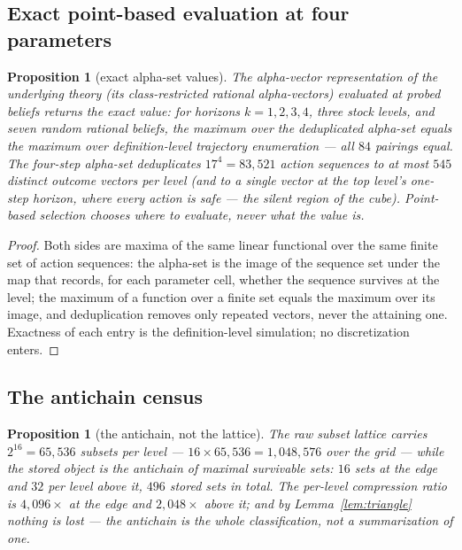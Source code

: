 \documentclass[10pt,twocolumn]{article}
\theoremstyle{plain}
\newtheorem{proposition}[theorem]{Proposition}
\theoremstyle{definition}
\theoremstyle{remark}
\begin{document}
\subsection{Exact point-based evaluation at four parameters}
\label{pbvi}

\begin{proposition}[exact alpha-set values]\label{prop:pbvi}
The alpha-vector representation of the underlying theory (its
class-restricted rational alpha-vectors) evaluated at probed beliefs
returns the exact value: for horizons \(k = 1, 2, 3, 4\), three stock
levels, and seven random rational beliefs, the maximum over the
deduplicated alpha-set equals the maximum over definition-level
trajectory enumeration --- all \(84\) pairings equal. The four-step
alpha-set deduplicates \(17^{4} = 83{,}521\) action sequences to at
most \(545\) distinct outcome vectors per level (and to a single
vector at the top level's one-step horizon, where every action is
safe --- the silent region of the cube). Point-based selection
chooses where to evaluate, never what the value is.
\end{proposition}

\begin{proof}
Both sides are maxima of the same linear functional over the same
finite set of action sequences: the alpha-set is the image of the
sequence set under the map that records, for each parameter cell,
whether the sequence survives at the level; the maximum of a function
over a finite set equals the maximum over its image, and
deduplication removes only repeated vectors, never the attaining one.
Exactness of each entry is the definition-level simulation; no
discretization enters.
\end{proof}

\subsection{The antichain census}\label{census}

\begin{proposition}[the antichain, not the lattice]\label{prop:census}
The raw subset lattice carries \(2^{16} = 65{,}536\) subsets per
level --- \(16 \times 65{,}536 = 1{,}048{,}576\) over the grid ---
while the stored object is the antichain of maximal survivable sets:
\(16\) sets at the edge and \(32\) per level above it, \(496\) stored
sets in total. The per-level compression ratio is \(4{,}096\times\) at
the edge and \(2{,}048\times\) above it; and by
Lemma~\ref{lem:triangle} nothing is lost --- the antichain is the
whole classification, not a summarization of one.
\end{proposition}
\end{document}
